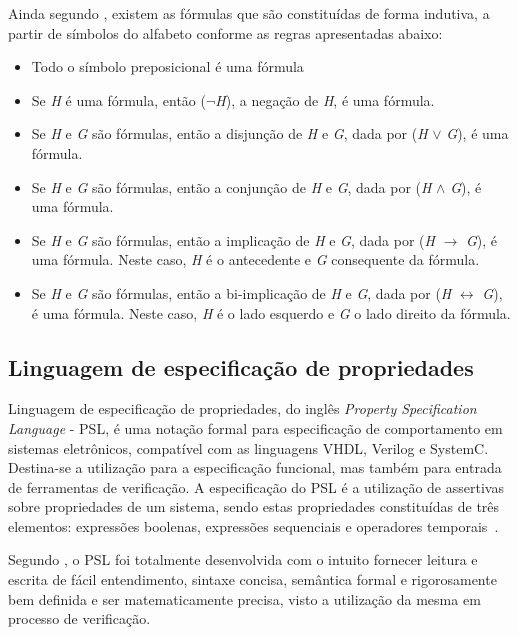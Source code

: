 Ainda segundo \citeauthor{souza2017logica}, existem as fórmulas que são constituídas de forma indutiva, a partir de símbolos do alfabeto conforme as regras apresentadas abaixo:
\begin{itemize}
\item Todo o símbolo preposicional é uma fórmula
\item Se \textit{H} é uma fórmula, então ($\neg$\textit{H}), a negação de \textit{H}, é uma fórmula.
\item Se \textit{H} e \textit{G} são fórmulas, então a disjunção de \textit{H} e \textit{G}, dada por (\textit{H} $\lor$ \textit{G}), é uma fórmula.
\item Se \textit{H} e \textit{G} são fórmulas, então a conjunção de \textit{H} e \textit{G}, dada por (\textit{H} $\land$ \textit{G}), é uma fórmula.
\item Se \textit{H} e \textit{G} são fórmulas, então a implicação de \textit{H} e \textit{G}, dada por (\textit{H} $\rightarrow$ \textit{G}), é uma fórmula. Neste caso, \textit{H} é o antecedente e \textit{G} consequente da fórmula.
\item Se \textit{H} e \textit{G} são fórmulas, então a bi-implicação de \textit{H} e \textit{G}, dada por (\textit{H} $\leftrightarrow$ \textit{G}), é uma fórmula. Neste caso, \textit{H} é o lado esquerdo e \textit{G} o lado direito da fórmula.
\end{itemize}


\subsection{Linguagem de especificação de propriedades}
Linguagem de especificação de propriedades, do inglês \textit{Property Specification Language} - PSL, é uma notação formal para especificação de comportamento em sistemas eletrônicos, compatível com as linguagens VHDL\cite{IEEEVHDLLanguage}, Verilog\cite{IEEEVerilogLanguage} e SystemC\cite{IEEESystemCLanguage}. Destina-se a utilização para a especificação funcional, mas também para entrada de ferramentas de verificação. A especificação do PSL é a utilização de assertivas sobre propriedades de um sistema, sendo estas propriedades constituídas de três elementos: expressões boolenas, expressões sequenciais e operadores temporais~\cite{IEEEPSL}.

\par
Segundo \cite{IEEEPSL}, o PSL foi totalmente desenvolvida com o intuito fornecer leitura e escrita de fácil entendimento, sintaxe concisa, semântica formal e rigorosamente bem definida e ser matematicamente precisa, visto a utilização da mesma em processo de verificação. 

